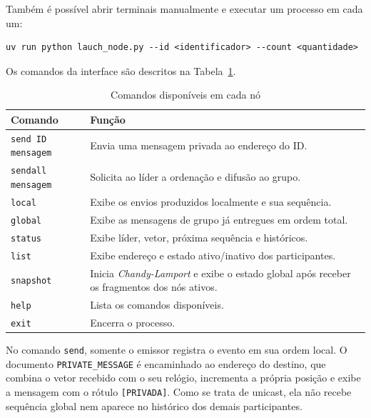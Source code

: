 Também é possível abrir terminais manualmente e executar um processo em cada
um:

\begin{lstlisting}[style=bash, numbers=none]
uv run python lauch_node.py --id <identificador> --count <quantidade>
\end{lstlisting}

Os comandos da interface são descritos na Tabela~\ref{tab:comandos}.

\begin{table}[H]
    \centering
    \caption{Comandos disponíveis em cada nó}
    \label{tab:comandos}
    \begin{tabular}{p{4.5cm} p{9.5cm}}
        \toprule
        \textbf{Comando}              & \textbf{Função}                                          \\
        \midrule
        \texttt{send ID mensagem}     & Envia uma mensagem privada ao endereço do ID.            \\
        \texttt{sendall mensagem}     & Solicita ao líder a ordenação e difusão ao grupo.        \\
        \texttt{local}                & Exibe os envios produzidos localmente e sua sequência.   \\
        \texttt{global}               & Exibe as mensagens de grupo já entregues em ordem total. \\
        \texttt{status}               & Exibe líder, vetor, próxima sequência e históricos.      \\
        \texttt{list}                 & Exibe endereço e estado ativo/inativo dos participantes. \\
        \texttt{snapshot}             & Inicia \textit{Chandy-Lamport} e exibe o estado global após
        receber os fragmentos dos nós ativos.                                                    \\
        \texttt{help} & Lista os comandos disponíveis.                                            \\
        \texttt{exit} & Encerra o processo.                                                       \\
        \bottomrule
    \end{tabular}
\end{table}

No comando \texttt{send}, somente o emissor registra o evento em sua ordem
local. O documento \texttt{PRIVATE\_MESSAGE} é encaminhado ao endereço do
destino, que combina o vetor recebido com o seu relógio, incrementa a própria
posição e exibe a mensagem com o rótulo \texttt{[PRIVADA]}. Como se trata de
unicast, ela não recebe sequência global nem aparece no histórico dos demais
participantes.

